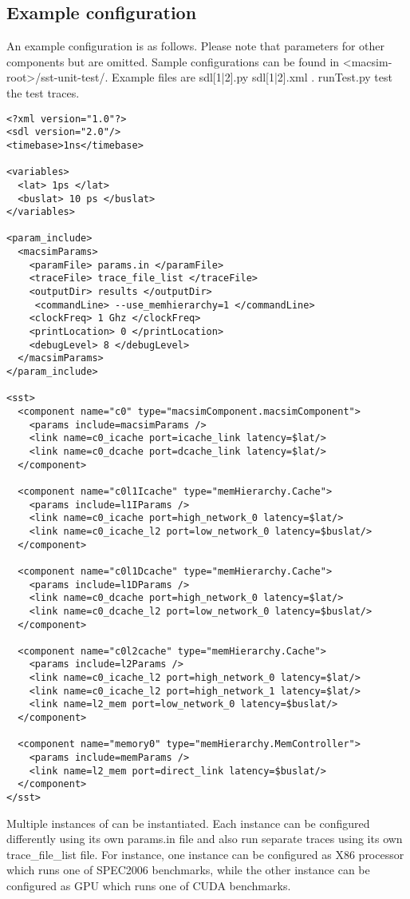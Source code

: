 \subsection{Example configuration}

An example configuration is as follows.
Please note that parameters for other components but \SIM are omitted.
Sample configurations can be found in
<macsim-root>/sst-unit-test/.
Example files are sdl[1|2].py sdl[1|2].xml . runTest.py test the test
traces. 

\begin{Verbatim}
<?xml version="1.0"?>
<sdl version="2.0"/>
<timebase>1ns</timebase>

<variables>
  <lat> 1ps </lat>
  <buslat> 10 ps </buslat>
</variables>

<param_include>
  <macsimParams>
    <paramFile> params.in </paramFile>
    <traceFile> trace_file_list </traceFile>
    <outputDir> results </outputDir>
     <commandLine> --use_memhierarchy=1 </commandLine>
    <clockFreq> 1 Ghz </clockFreq>
    <printLocation> 0 </printLocation>
    <debugLevel> 8 </debugLevel>
  </macsimParams>
</param_include>

<sst>
  <component name="c0" type="macsimComponent.macsimComponent">
    <params include=macsimParams />
    <link name=c0_icache port=icache_link latency=$lat/>
    <link name=c0_dcache port=dcache_link latency=$lat/>
  </component>

  <component name="c0l1Icache" type="memHierarchy.Cache">
    <params include=l1IParams />
    <link name=c0_icache port=high_network_0 latency=$lat/>
    <link name=c0_icache_l2 port=low_network_0 latency=$buslat/>
  </component>

  <component name="c0l1Dcache" type="memHierarchy.Cache">
    <params include=l1DParams />
    <link name=c0_dcache port=high_network_0 latency=$lat/>
    <link name=c0_dcache_l2 port=low_network_0 latency=$buslat/>
  </component>

  <component name="c0l2cache" type="memHierarchy.Cache">
    <params include=l2Params />
    <link name=c0_icache_l2 port=high_network_0 latency=$lat/>
    <link name=c0_icache_l2 port=high_network_1 latency=$lat/>
    <link name=l2_mem port=low_network_0 latency=$buslat/>
  </component>

  <component name="memory0" type="memHierarchy.MemController">
    <params include=memParams />
    <link name=l2_mem port=direct_link latency=$buslat/>
  </component>
</sst>
\end{Verbatim}
Multiple instances of \SIM can be instantiated.
Each instance can be configured differently using its own params.in file and also run separate traces using its own trace\_file\_list file.
For instance, one \SIM instance can be configured as X86 processor which runs one of SPEC2006 benchmarks, while the other \SIM instance can be configured as GPU which runs one of CUDA benchmarks. 

